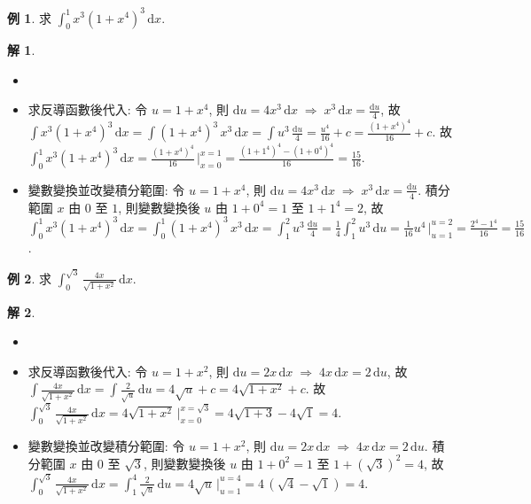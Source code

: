 \documentclass[12pt]{extarticle}
\newcommand{\ds}{\displaystyle}
\newcommand{\ie}{\;\Longrightarrow\;}
\theoremstyle{definition}
\newtheorem*{ex}{例}
\newtheorem*{sol}{解}
\begin{document}
\begin{ex}
  求 $\ds\int_0^1 x^3(1 + x^4)^3\,\text{d}x$. 
\end{ex}

\begin{sol}
  \begin{itemize}\setlength{\itemsep}{0pt}
    \item[]
    \item 求反導函數後代入: 令 $\ds u = 1 + x^4$, 則 $\ds\text{d}u = 4 x^3\,\text{d}x\ie x^3\,\text{d}x = \frac{\text{d}u}{4}$, 故 $\ds\int x^3(1 + x^4)^3\,\text{d}x = \int (1 + x^4)^3\,x^3\,\text{d}x = \int u^3\,\frac{\text{d}u}{4} = \frac{u^4}{16} + c = \frac{(1 + x^4)^4}{16} + c$. 故 $\ds\int_0^1 x^3(1 + x^4)^3\,\text{d}x = \frac{(1 + x^4)^4}{16}\,\Big|_{x = 0}^{x = 1} = \frac{(1 + 1^4)^4 - (1 + 0^4)^4}{16} = \frac{15}{16}$. 
    \item 變數變換並改變積分範圍: 令 $\ds u = 1 + x^4$, 則 $\ds\text{d}u = 4 x^3\,\text{d}x\ie x^3\,\text{d}x = \frac{\text{d}u}{4}$. 積分範圍 $x$ 由 $0$ 至 $1$, 則變數變換後 $u$ 由 $\ds 1 + 0^4 = 1$ 至 $\ds1 + 1^4 = 2$, 故 $\ds\int_0^1 x^3(1 + x^4)^3\,\text{d}x = \int_0^1 (1 + x^4)^3\,x^3\,\text{d}x = \int_1^2 u^3\,\frac{\text{d}u}{4} = \frac{1}{4}\int_1^2 u^3\,\text{d}u = \frac{1}{16} u^4\,\Big|_{u = 1}^{u = 2} = \frac{2^4 - 1^4}{16} = \frac{15}{16}$. 
  \end{itemize}
\end{sol}

\begin{ex}
  求 $\ds\int_0^{\sqrt{3}}\frac{4x}{\sqrt{1 + x^2}}\,\text{d}x$. 
\end{ex}

\begin{sol}
  \begin{itemize}\setlength{\itemsep}{0pt}
    \item[]
    \item 求反導函數後代入: 令 $\ds u = 1 + x^2$, 則 $\ds\text{d}u = 2 x\,\text{d}x\ie 4x\,\text{d}x = 2\,\text{d}u$, 故 $\ds\int\!\frac{4x}{\sqrt{1 + x^2}}\,\text{d}x = \int\!\frac{2}{\sqrt{u}}\,\text{d}u = 4\sqrt{u} + c = 4\sqrt{1 + x^2} + c$. 故 $\ds\int_0^{\sqrt{3}}\frac{4x}{\sqrt{1 + x^2}}\,\text{d}x = 4\sqrt{1 + x^2}\,\Big|_{x = 0}^{x = \sqrt{3}} = 4\sqrt{1 + 3} - 4\sqrt{1} = 4$. 
    \item 變數變換並改變積分範圍: 令 $\ds u = 1 + x^2$, 則 $\ds\text{d}u = 2 x\,\text{d}x\ie 4x\,\text{d}x = 2\,\text{d}u$. 積分範圍 $x$ 由 $0$ 至 $\sqrt{3}$, 則變數變換後 $u$ 由 $\ds1 + 0^2 = 1$ 至 $\ds1 + (\sqrt{3})^2 = 4$, 故 $\ds\int_0^{\sqrt{3}}\frac{4x}{\sqrt{1 + x^2}}\,\text{d}x = \int_1^4 \frac{2}{\sqrt{u}}\,\text{d}u = 4\sqrt{u}\,\Big|_{u = 1}^{u = 4} = 4\,(\sqrt{4} - \sqrt{1}) = 4$. 
  \end{itemize}
\end{sol}
\end{document}
